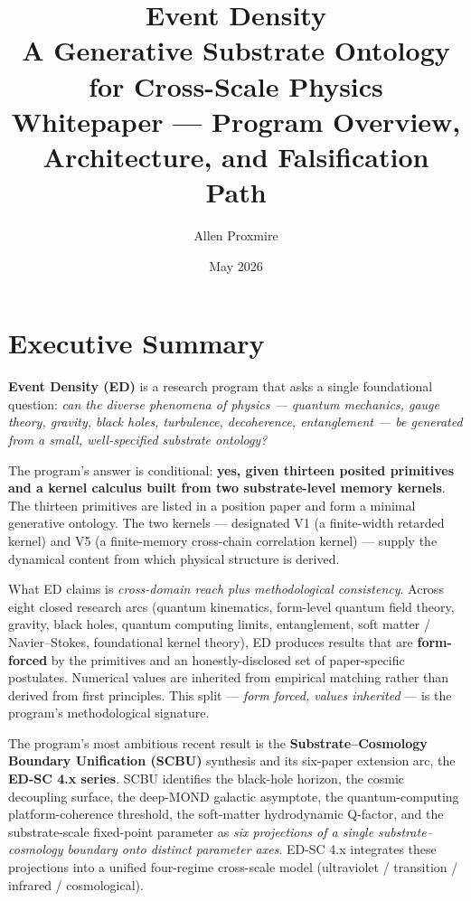 \documentclass[11pt,a4paper]{article}
\title{\vspace{-1cm}\Large\bfseries Event Density\\[6pt]
\large\mdseries A Generative Substrate Ontology for Cross-Scale Physics\\[4pt]
\normalsize\mdseries Whitepaper --- Program Overview, Architecture, and Falsification Path}
\author{Allen Proxmire}
\date{May 2026}
\begin{document}
\maketitle

\section*{Executive Summary}

\textbf{Event Density (ED)} is a research program that asks a single foundational question: \emph{can the diverse phenomena of physics --- quantum mechanics, gauge theory, gravity, black holes, turbulence, decoherence, entanglement --- be generated from a small, well-specified substrate ontology?}

The program's answer is conditional: \textbf{yes, given thirteen posited primitives and a kernel calculus built from two substrate-level memory kernels}. The thirteen primitives are listed in a position paper and form a minimal generative ontology. The two kernels --- designated V1 (a finite-width retarded kernel) and V5 (a finite-memory cross-chain correlation kernel) --- supply the dynamical content from which physical structure is derived.

What ED claims is \emph{cross-domain reach plus methodological consistency}. Across eight closed research arcs (quantum kinematics, form-level quantum field theory, gravity, black holes, quantum computing limits, entanglement, soft matter / Navier--Stokes, foundational kernel theory), ED produces results that are \textbf{form-forced} by the primitives and an honestly-disclosed set of paper-specific postulates. Numerical values are inherited from empirical matching rather than derived from first principles. This split --- \emph{form forced, values inherited} --- is the program's methodological signature.

The program's most ambitious recent result is the \textbf{Substrate--Cosmology Boundary Unification (SCBU)} synthesis and its six-paper extension arc, the \textbf{ED-SC 4.x series}. SCBU identifies the black-hole horizon, the cosmic decoupling surface, the deep-MOND galactic asymptote, the quantum-computing platform-coherence threshold, the soft-matter hydrodynamic Q-factor, and the substrate-scale fixed-point parameter as \emph{six projections of a single substrate--cosmology boundary onto distinct parameter axes}. ED-SC 4.x integrates these projections into a unified four-regime cross-scale model (ultraviolet / transition / infrared / cosmological).
\end{document}
